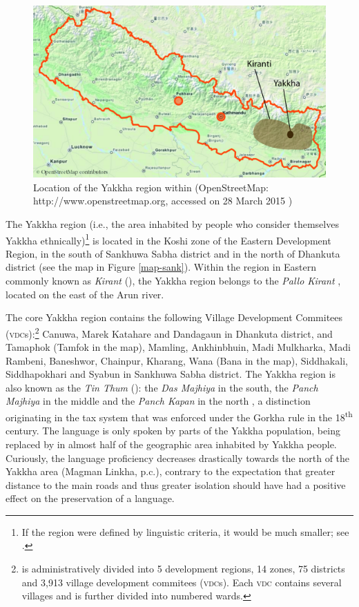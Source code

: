 \begin{figure}
\centering
\includegraphics[width=\textwidth]{figures/Nepalmap.png}
\caption{Location of the Yakkha region within  (OpenStreetMap: http://www.openstreetmap.org, accessed on 28 March 2015 )}\label{nepalmap}
\end{figure}

The Yakkha region (i.e., the area inhabited by people who consider themselves Yakkha ethnically)\footnote{If the region were defined by linguistic criteria, it would be much smaller; see .} is located in the Koshi zone of the Eastern Development Region, in the south of Sankhuwa Sabha district and in the north of Dhankuta  district  (see the map in Figure \ref{map-sank}). Within the region in  Eastern  commonly known as \emph{Kirant} (), the Yakkha region belongs to the \emph{Pallo Kirant} , located on the east of the Arun river. 

The core Yakkha region contains the following Village Development Commitees (\textsc{vdc}s):\footnote{ is administratively divided into 5 development regions, 14 zones, 75 districts and  3,913 village development commitees (\textsc{vdc}s). Each \textsc{vdc}  contains several villages and is further divided into numbered wards.} Canuwa, Marek Katahare and Dandagaun in Dhankuta district, and Tamaphok (Tamfok in the map), Mamling, Ankhinbhuin, Madi Mulkharka, Madi Rambeni, Baneshwor, Chainpur, Kharang, Wana (Bana in the map), Siddhakali, Siddhapokhari and Syabun in Sankhuwa Sabha district. The Yakkha region is also known as the \emph{Tin Thum} (): the \emph{Das Majhiya} in the south, the \emph{Panch Majhiya} in the middle and the \emph{Panch Kapan} in the north  \citep[86]{Kongren2007Indigenous}, a distinction originating in the tax system that was enforced under the Gorkha rule in the 18\textsuperscript{th} century. The language is  only spoken by parts of the Yakkha population, being replaced by  in almost half of the geographic area inhabited by Yakkha people. Curiously, the language proficiency decreases drastically towards the north of the Yakkha area (Magman Linkha, p.c.), contrary to the expectation that greater distance to the main roads and thus greater isolation should have had a positive effect on the preservation of a language. 


